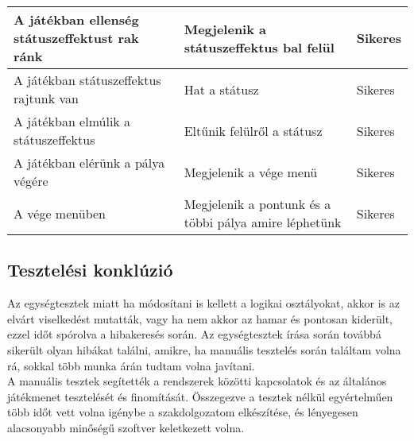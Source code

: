 \begin{center}
\begin{longtable}{| m{} | m{} | m{}|}
		A játékban ellenség státuszeffektust rak ránk & Megjelenik a státuszeffektus bal felül & Sikeres\\ \hline
		
		A játékban státuszeffektus rajtunk van & Hat a státusz & Sikeres\\ \hline
		
		A játékban elmúlik a státuszeffektus & Eltűnik felülről a státusz & Sikeres\\ \hline
		
		A játékban elérünk a pálya végére & Megjelenik a vége menü & Sikeres\\ \hline
		
		A vége menüben & Megjelenik a pontunk és a többi pálya amire léphetünk & Sikeres\\ \hline
		
	\end{longtable}
\end{center}

\subsection{Tesztelési konklúzió}

Az egységtesztek miatt ha módosítani is kellett a logikai osztályokat, akkor is az elvárt viselkedést mutatták, vagy ha nem akkor az hamar és pontosan kiderült, ezzel időt spórolva a hibakeresés során. Az egységtesztek írása során továbbá sikerült olyan hibákat találni, amikre, ha manuális tesztelés során találtam volna rá, sokkal több munka árán tudtam volna javítani.\\
A manuális tesztek segítették a rendszerek közötti kapcsolatok és az általános játékmenet tesztelését és finomítását. Összegezve a tesztek nélkül egyértelműen több időt vett volna igénybe a szakdolgozatom elkészítése, és lényegesen alacsonyabb minőségű szoftver keletkezett volna.